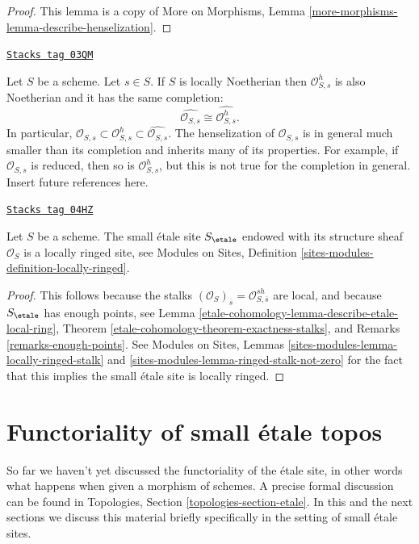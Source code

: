 \begin{proof}
This lemma is a copy of
More on Morphisms, Lemma \ref{more-morphisms-lemma-describe-henselization}.
\end{proof}

\begin{remark}
\label{etale-cohomology-remark-henselization-Noetherian}
\href{https://stacks.math.columbia.edu/tag/03QM}{\texttt{Stacks tag 03QM}}

Let $S$ be a scheme. Let $s \in S$.
If $S$ is locally Noetherian then $\mathcal{O}_{S, s}^h$
is also Noetherian and it has the same completion:
$$
\widehat{\mathcal{O}_{S, s}} \cong \widehat{\mathcal{O}_{S, s}^h}.
$$
In particular,
$\mathcal{O}_{S, s} \subset
\mathcal{O}_{S, s}^h \subset
\widehat{\mathcal{O}_{S, s}}$.
The henselization of $\mathcal{O}_{S, s}$ is in general much
smaller than its completion and inherits many of its properties.
For example, if $\mathcal{O}_{S, s}$ is reduced, then so is
$\mathcal{O}_{S, s}^h$, but this is not true for the completion in general.
Insert future references here.
\end{remark}

\begin{lemma}
\label{etale-cohomology-lemma-etale-site-locally-ringed}
\href{https://stacks.math.columbia.edu/tag/04HZ}{\texttt{Stacks tag 04HZ}}

Let $S$ be a scheme. The small \'etale site $S_\etale$ endowed with
its structure sheaf $\mathcal{O}_S$ is a locally ringed site, see
Modules on Sites, Definition \ref{sites-modules-definition-locally-ringed}.
\end{lemma}

\begin{proof}
This follows because the stalks
$(\mathcal{O}_S)_{\overline{s}} = \mathcal{O}^{sh}_{S, \overline{s}}$ are
local, and because $S_\etale$ has enough points, see
Lemma \ref{etale-cohomology-lemma-describe-etale-local-ring},
Theorem \ref{etale-cohomology-theorem-exactness-stalks},
and
Remarks \ref{remarks-enough-points}.
See
Modules on Sites, Lemmas \ref{sites-modules-lemma-locally-ringed-stalk} and
\ref{sites-modules-lemma-ringed-stalk-not-zero}
for the fact that this implies the small \'etale site is locally ringed.
\end{proof}

\section{Functoriality of small \'etale topos}
\label{etale-cohomology-section-functoriality}
So far we haven't yet discussed the functoriality of the \'etale site, in
other words what happens when given a morphism of schemes. A precise formal
discussion can be found in
Topologies, Section \ref{topologies-section-etale}.
In this and the next sections we discuss this material briefly specifically
in the setting of small \'etale sites.

